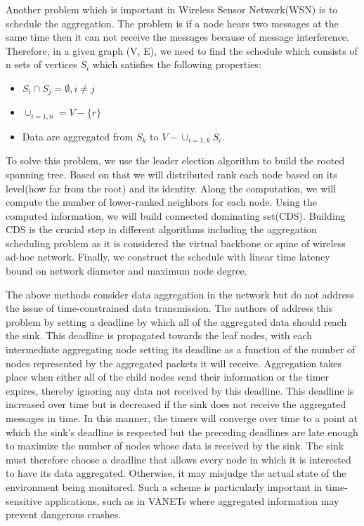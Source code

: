 \documentclass{IEEEtran}
\begin{document}
Another problem which is important in Wireless Sensor Network(WSN) is to schedule the aggregation\cite{DDAS}. The problem is if a node hears two messages at the same time then it can not receive the messages because of message interference. Therefore, in a given graph (V, E), we need to find the schedule which consists of n sets of vertices $S_i$ which satisfies the following properties:
\begin{itemize}
\item $S_i \cap S_j = \emptyset, i \neq j$
\item $\cup_{i=1,n} = V - \{r\}$
\item Data are aggregated from $S_k$ to $V - \cup_{i=1,k}S_i$.
\end{itemize}
To solve this problem, we use the leader election \cite{LeaderElection} algorithm to build the rooted spanning tree. Based on that we will distributed rank each node based on its level(how far from the root) and its identity. Along the computation, we will compute the number of lower-ranked neighbors for each node. Using the computed information, we will build connected dominating set(CDS)\cite{CDS}. Building CDS is the crucial step in different algorithms including the aggregation scheduling problem as it is considered the virtual backbone or spine of wireless ad-hoc network. Finally, we construct the schedule with linear time latency bound on network diameter and maximum node degree.

The above methods consider data aggregation in the network but do not address the issue of time-constrained data transmission.  The authors of \cite{time} address this problem by setting a deadline by which all of the aggregated data should reach the sink.  This deadline is propagated towards the leaf nodes, with each intermediate aggregating node setting its deadline as a function of the number of nodes represented by the aggregated packets it will receive.  Aggregation takes place when either all of the child nodes send their information or the timer expires, thereby ignoring any data not received by this deadline.  This deadline is increased over time but is decreased if the sink does not receive the aggregated messages in time.  In this manner, the timers will converge over time to a point at which the sink’s deadline is respected but the preceding deadlines are late enough to maximize the number of nodes whose data is received by the sink.  The sink must therefore choose a deadline that allows every node in which it is interested to have its data aggregated.  Otherwise, it may misjudge the actual state of the environment being monitored.  Such a scheme is particularly important in time-sensitive applications, such as in VANETs where aggregated information may prevent dangerous crashes.
\end{document}
